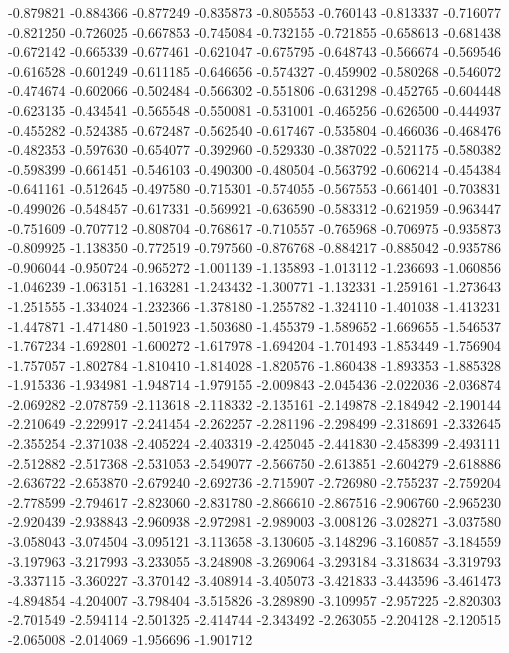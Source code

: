 -0.879821
-0.884366
-0.877249
-0.835873
-0.805553
-0.760143
-0.813337
-0.716077
-0.821250
-0.726025
-0.667853
-0.745084
-0.732155
-0.721855
-0.658613
-0.681438
-0.672142
-0.665339
-0.677461
-0.621047
-0.675795
-0.648743
-0.566674
-0.569546
-0.616528
-0.601249
-0.611185
-0.646656
-0.574327
-0.459902
-0.580268
-0.546072
-0.474674
-0.602066
-0.502484
-0.566302
-0.551806
-0.631298
-0.452765
-0.604448
-0.623135
-0.434541
-0.565548
-0.550081
-0.531001
-0.465256
-0.626500
-0.444937
-0.455282
-0.524385
-0.672487
-0.562540
-0.617467
-0.535804
-0.466036
-0.468476
-0.482353
-0.597630
-0.654077
-0.392960
-0.529330
-0.387022
-0.521175
-0.580382
-0.598399
-0.661451
-0.546103
-0.490300
-0.480504
-0.563792
-0.606214
-0.454384
-0.641161
-0.512645
-0.497580
-0.715301
-0.574055
-0.567553
-0.661401
-0.703831
-0.499026
-0.548457
-0.617331
-0.569921
-0.636590
-0.583312
-0.621959
-0.963447
-0.751609
-0.707712
-0.808704
-0.768617
-0.710557
-0.765968
-0.706975
-0.935873
-0.809925
-1.138350
-0.772519
-0.797560
-0.876768
-0.884217
-0.885042
-0.935786
-0.906044
-0.950724
-0.965272
-1.001139
-1.135893
-1.013112
-1.236693
-1.060856
-1.046239
-1.063151
-1.163281
-1.243432
-1.300771
-1.132331
-1.259161
-1.273643
-1.251555
-1.334024
-1.232366
-1.378180
-1.255782
-1.324110
-1.401038
-1.413231
-1.447871
-1.471480
-1.501923
-1.503680
-1.455379
-1.589652
-1.669655
-1.546537
-1.767234
-1.692801
-1.600272
-1.617978
-1.694204
-1.701493
-1.853449
-1.756904
-1.757057
-1.802784
-1.810410
-1.814028
-1.820576
-1.860438
-1.893353
-1.885328
-1.915336
-1.934981
-1.948714
-1.979155
-2.009843
-2.045436
-2.022036
-2.036874
-2.069282
-2.078759
-2.113618
-2.118332
-2.135161
-2.149878
-2.184942
-2.190144
-2.210649
-2.229917
-2.241454
-2.262257
-2.281196
-2.298499
-2.318691
-2.332645
-2.355254
-2.371038
-2.405224
-2.403319
-2.425045
-2.441830
-2.458399
-2.493111
-2.512882
-2.517368
-2.531053
-2.549077
-2.566750
-2.613851
-2.604279
-2.618886
-2.636722
-2.653870
-2.679240
-2.692736
-2.715907
-2.726980
-2.755237
-2.759204
-2.778599
-2.794617
-2.823060
-2.831780
-2.866610
-2.867516
-2.906760
-2.965230
-2.920439
-2.938843
-2.960938
-2.972981
-2.989003
-3.008126
-3.028271
-3.037580
-3.058043
-3.074504
-3.095121
-3.113658
-3.130605
-3.148296
-3.160857
-3.184559
-3.197963
-3.217993
-3.233055
-3.248908
-3.269064
-3.293184
-3.318634
-3.319793
-3.337115
-3.360227
-3.370142
-3.408914
-3.405073
-3.421833
-3.443596
-3.461473
-4.894854
-4.204007
-3.798404
-3.515826
-3.289890
-3.109957
-2.957225
-2.820303
-2.701549
-2.594114
-2.501325
-2.414744
-2.343492
-2.263055
-2.204128
-2.120515
-2.065008
-2.014069
-1.956696
-1.901712
